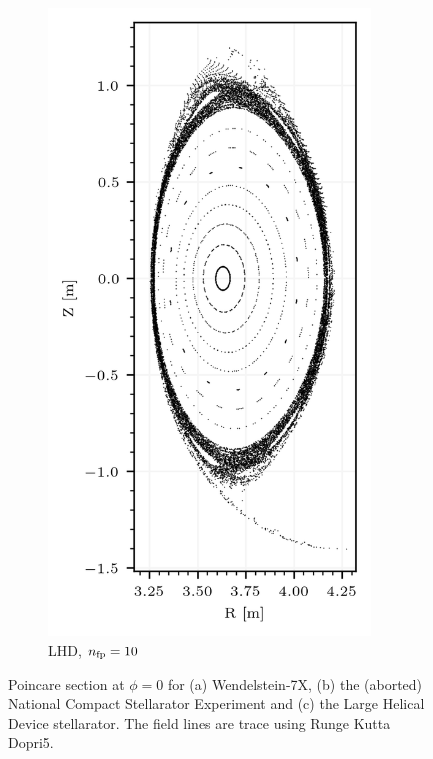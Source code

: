 \begin{figure}[H]
\begin{subfigure}[c]{0.32\textwidth}
        \includegraphics[width=0.94\textwidth]{images/theory/lhd.png}
        \caption{LHD, $n_\text{fp} = 10$}
        \label{fig:lhd-default}
    \end{subfigure}
    \caption{Poincare section at $\phi = 0$ for (a) Wendelstein-7X, (b) the (aborted) National Compact Stellarator Experiment and (c) the Large Helical Device stellarator. The field lines are trace using Runge Kutta Dopri5.}
    \label{fig:poincare-example}
\end{figure}

